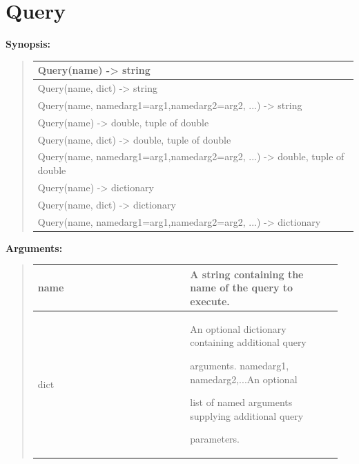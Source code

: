 \documentclass[letterpaper,10pt,english]{sphinxmanual}
\begin{document}
\section{Query}
\label{functions:query}
\begin{DUlineblock}{0em}
\item[] \textbf{Synopsis:}
\end{DUlineblock}
\begin{quote}

\begin{tabulary}{\linewidth}{|L|}
\hline

Query(name) -\textgreater{} string
\\
\hline
Query(name, dict) -\textgreater{} string
\\
\hline
Query(name, namedarg1=arg1,namedarg2=arg2, ...) -\textgreater{} string
\\
\hline
Query(name) -\textgreater{} double, tuple of double
\\
\hline
Query(name, dict) -\textgreater{} double, tuple of double
\\
\hline
Query(name, namedarg1=arg1,namedarg2=arg2, ...) -\textgreater{} double, tuple of double
\\
\hline
Query(name) -\textgreater{} dictionary
\\
\hline
Query(name, dict) -\textgreater{} dictionary
\\
\hline
Query(name, namedarg1=arg1,namedarg2=arg2, ...) -\textgreater{} dictionary
\\
\hline\end{tabulary}

\end{quote}

\begin{DUlineblock}{0em}
\item[] 
\item[] \textbf{Arguments:}
\end{DUlineblock}
\begin{quote}

\begin{tabular}{|p{0.475\linewidth}|p{0.475\linewidth}|}
\hline

name
 & 
A string containing the name of the query to execute.
\\
\hline
dict
 & 
\begin{DUlineblock}{0em}
\item[] An optional dictionary containing additional query
\item[] arguments. namedarg1, namedarg2,...An optional
\item[] list of named arguments supplying additional query
\item[] parameters.
\end{DUlineblock}
\\
\hline\end{tabular}

\end{quote}
\end{document}
